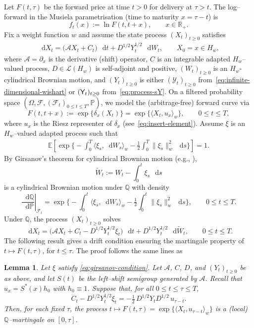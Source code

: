 \documentclass[10pt,a4paper,reqno]{amsart}
\newcommand*\D{\mathop{}\!\mathrm{d}}
\numberwithin{equation}{section}
\newtheorem{lemma}[theorem]{Lemma}
\theoremstyle{plain}
\theoremstyle{definition}
\theoremstyle{example}
\renewcommand{\MR}{\mathbb{R}}
\newcommand{\MP}{\mathbb{P}}
\newcommand{\MQ}{\mathbb{Q}}
\newcommand{\R}{\MR}
\newcommand{\cF}{\mathcal{F}}
\newcommand{\cA}{\mathcal{A}}
\newcommand{\cL}{\mathcal{L}}
\newcommand{\cY}{\mathcal{Y}}
\begin{document}
Let $F(t,\tau)$ be the forward price at time $t>0$ for delivery at $\tau>t$.
The log–forward in the Musiela parametrisation (time to maturity $x=\tau-t$) is
$$
  f_t(x) := \ln F(t,t+x), \qquad x \in \R_+.
$$
Fix a weight function $w$ and assume the state process $(X_t)_{t\ge0}$ satisfies
\begin{align}\label{eq:X-under-P}
  \D X_t
  = \big( \cA X_t + C_t \big)\,\D t
    + D^{1/2} Y_t^{1/2}\, \D W_t, 
  \qquad X_0 = x \in H_w,
\end{align}
where $\cA=\partial_x$ is the derivative (shift) operator, $C$ is an integrable adapted $H_w$–valued process, 
$D\in\cL(H_w)$ is self-adjoint and positive, $(W_t)_{t\ge0}$ is an $H_w$-cylindrical Brownian motion, and $(Y_t)_{t\ge0}$
is either $(\cY_t)_{t\ge0}$ from~\eqref{eq:infinite-dimensional-wishart} or $({\sf Y}_t)_{t\ge0}$ from~\eqref{eq:process-sY}.
On a filtered probability space $(\Omega,\cF,(\cF_t)_{0\le t\le T},\MP)$, we model the (arbitrage-free) forward curve via
\begin{equation}\label{dynamics-f}
  F(t,t+x) := \exp\{\delta_x(X_t)\}
             = \exp\{\langle X_t, u_x\rangle_w\}, 
  \qquad 0\le t\le T,
\end{equation}
where $u_x$ is the Riesz representer of $\delta_x$ (see~\eqref{eq:insert-element}). Assume $\xi$ is an $H_w$–valued adapted process such that
\begin{align}\label{eq:girsanov-condition}
  \mathbb{E}\left[\exp\Big\{-\int_0^T \langle \xi_s, \D W_s\rangle_w
                 - \tfrac12 \int_0^T \|\xi_s\|_w^2\,\D s\Big\}\right]=1.
\end{align}
By Girsanov’s theorem for cylindrical Brownian motion (e.g., \cite[Thm.~13]{da2013strong}), 
$$
  \widetilde W_t := W_t - \int_0^t \xi_s\,\D s
$$
is a cylindrical Brownian motion under $\MQ$ with density
$$
  \left.\frac{\D\MQ}{\D\MP}\right|_{\cF_t}
  = \exp\Big\{-\int_0^t \langle \xi_s, \D W_s\rangle_w
                 - \tfrac12 \int_0^t \|\xi_s\|_w^2\,\D s\Big\}, \qquad 0\le t\le T.
$$
Under $\MQ$, the process $(X_{t})_{t\geq 0}$ solves
\begin{equation}\label{eq:X-under-Q}
  \D X_t
  = \big(\cA X_t + C_t - D^{1/2} Y_t^{1/2}\xi_t\big)\,\D t
    + D^{1/2} Y_t^{1/2}\,\D \widetilde W_t, \qquad 0\le t\le T.
\end{equation}
The following result gives a drift condition ensuring the martingale property of $t \mapsto F(t,\tau)$, for $t\leq \tau$. The proof follows the same lines as \cite[Proposition 6.1]{zbMATH07927020}
\begin{lemma}\label{lem:drift-condition}
Let $\xi$ satisfy \eqref{eq:girsanov-condition}. Let $\cA$, $C$, $D$, and $(Y_t)_{t\ge0}$ be as above, and 
let $S(t)$ be the left–shift semigroup generated by $\cA$. Recall that $u_x=S^*(x)h_0$ with $h_0\equiv 1$. Suppose that, for all $0\le t\le \tau\le T$,
\begin{equation}\label{eq:drift-condition}
  C_t - D^{1/2} Y_t^{1/2}\xi_t
  = -\tfrac12\, D^{1/2} Y_t D^{1/2} \, u_{\tau-t}.
\end{equation}
Then, for each fixed $\tau$, the process $t\mapsto F(t,\tau)=\exp\{\langle X_t,u_{\tau-t}\rangle_w\}$ is a (local) $\MQ$–martingale on $[0,\tau]$.
\end{lemma}
\end{document}
